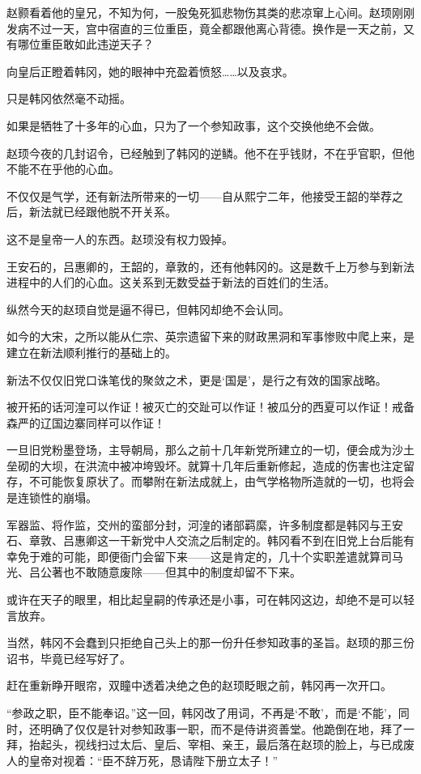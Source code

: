 赵颢看着他的皇兄，不知为何，一股兔死狐悲物伤其类的悲凉窜上心间。赵顼刚刚发病不过一天，宫中宿直的三位重臣，竟全都跟他离心背德。换作是一天之前，又有哪位重臣敢如此违逆天子？

向皇后正瞪着韩冈，她的眼神中充盈着愤怒……以及哀求。

只是韩冈依然毫不动摇。

如果是牺牲了十多年的心血，只为了一个参知政事，这个交换他绝不会做。

赵顼今夜的几封诏令，已经触到了韩冈的逆鳞。他不在乎钱财，不在乎官职，但他不能不在乎他的心血。

不仅仅是气学，还有新法所带来的一切——自从熙宁二年，他接受王韶的举荐之后，新法就已经跟他脱不开关系。

这不是皇帝一人的东西。赵顼没有权力毁掉。

王安石的，吕惠卿的，王韶的，章敦的，还有他韩冈的。这是数千上万参与到新法进程中的人们的心血。这关系到无数受益于新法的百姓们的生活。

纵然今天的赵顼自觉是逼不得已，但韩冈却绝不会认同。

如今的大宋，之所以能从仁宗、英宗遗留下来的财政黑洞和军事惨败中爬上来，是建立在新法顺利推行的基础上的。

新法不仅仅旧党口诛笔伐的聚敛之术，更是‘国是’，是行之有效的国家战略。

被开拓的话河湟可以作证！被灭亡的交趾可以作证！被瓜分的西夏可以作证！戒备森严的辽国边寨同样可以作证！

一旦旧党粉墨登场，主导朝局，那么之前十几年新党所建立的一切，便会成为沙土垒砌的大坝，在洪流中被冲垮毁坏。就算十几年后重新修起，造成的伤害也注定留存，不可能恢复原状了。而攀附在新法成就上，由气学格物所造就的一切，也将会是连锁性的崩塌。

军器监、将作监，交州的蛮部分封，河湟的诸部羁縻，许多制度都是韩冈与王安石、章敦、吕惠卿这一干新党中人交流之后制定的。韩冈看不到在旧党上台后能有幸免于难的可能，即便衙门会留下来——这是肯定的，几十个实职差遣就算司马光、吕公著也不敢随意废除——但其中的制度却留不下来。

或许在天子的眼里，相比起皇嗣的传承还是小事，可在韩冈这边，却绝不是可以轻言放弃。

当然，韩冈不会蠢到只拒绝自己头上的那一份升任参知政事的圣旨。赵顼的那三份诏书，毕竟已经写好了。

赶在重新睁开眼帘，双瞳中透着决绝之色的赵顼眨眼之前，韩冈再一次开口。

“参政之职，臣不能奉诏。”这一回，韩冈改了用词，不再是‘不敢’，而是‘不能’，同时，还明确了仅仅是针对参知政事一职，而不是侍讲资善堂。他跪倒在地，拜了一拜，抬起头，视线扫过太后、皇后、宰相、亲王，最后落在赵顼的脸上，与已成废人的皇帝对视着：“臣不辞万死，恳请陛下册立太子！”

